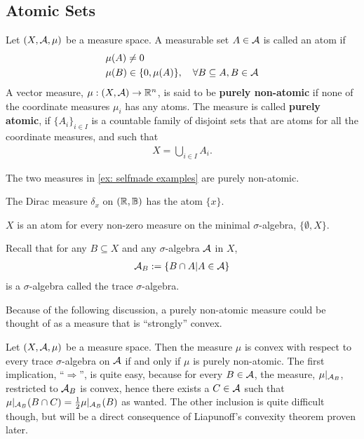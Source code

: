 
\subsection{Atomic Sets}

\begin{definition}
Let $(X, \mathcal{A}, \mu)$ be a measure space. A measurable set $A\in \mathcal{A}$ is called an atom if
\begin{align*}
	&\mu(A)\neq 0 \\
	&\mu(B) \in \{0, \mu(A)\}, \quad \forall B\subseteq A, B\in \mathcal{A}
\end{align*}
A vector measure, $\mu:(X,\mathcal{A})\to \mathbb{R}^{n}$, is said to be \textbf{purely non-atomic} if none of the coordinate measures $\mu_{i}$ has any atoms. The measure is called \textbf{purely atomic}, if $\{A_{i}\}_{i\in I}$ is a countable family of disjoint sets that are atoms for all the coordinate measures, and such that
\begin{align*}
	X=\bigcup_{i\in I}A_{i}.
\end{align*}
\end{definition}

\begin{example}
The two measures in \cref{ex: selfmade examples} are purely non-atomic.

The Dirac measure $\delta_{x}$ on $(\mathbb{R}, \mathbb{B})$ has the atom $\{x\}$.

$X$ is an atom for every non-zero measure on the minimal $\sigma$-algebra, $\{\emptyset, X\}$.
\end{example}

Recall that for any $B\subseteq X$ and any $\sigma$-algebra $\mathcal{A}$ in $X$,
\begin{align*}
	\mathcal{A}_{B}:=\{B\cap A|A\in \mathcal{A}\}
\end{align*}
is a $\sigma$-algebra called the trace $\sigma$-algebra.

Because of the following discussion, a purely non-atomic measure could be thought of as a measure that is ``strongly'' convex.

Let $(X, \mathcal{A}, \mu)$ be a measure space. Then the measure $\mu$ is convex with respect to every trace $\sigma$-algebra on $\mathcal{A}$ if and only if $\mu$ is purely non-atomic. The first implication, ``$\Rightarrow$'', is quite easy, because for every $B\in \mathcal{A}$, the measure, $\mu|_{\mathcal{A}_{B}}$, restricted to $\mathcal{A}_{B}$ is convex, hence there exists a $C\in \mathcal{A}$ such that $\mu|_{\mathcal{A}_{B}}(B\cap C)=\frac{1}{2}\mu|_{\mathcal{A}_{B}}(B)$ as wanted. The other inclusion is quite difficult though, but will be a direct consequence of Liapunoff's convexity theorem proven later.

